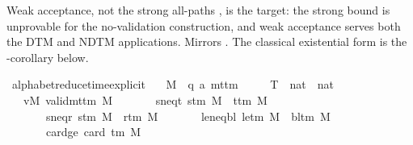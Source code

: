 \begin{isabellebody}
\begin{isamarkuptext}
  Weak acceptance, not the strong all-paths , is
  the target: the strong bound is unprovable for the no-validation
  construction, and weak acceptance serves both the DTM and NDTM
  applications.  Mirrors .  The classical
  existential form is the -corollary  below.%
\end{isamarkuptext}\isamarkuptrue%
\isamarkupfalse%
\ alphabet{\isacharunderscore}{\kern0pt}reduce{\isacharunderscore}{\kern0pt}time{\isacharunderscore}{\kern0pt}explicit{\isacharcolon}{\kern0pt}\isanewline
\ \ \ M\ {\isacharcolon}{\kern0pt}{\isacharcolon}{\kern0pt}\ {\isachardoublequoteopen}{\isacharparenleft}{\kern0pt}{\isacharprime}{\kern0pt}q{\isacharcomma}{\kern0pt}\ {\isacharprime}{\kern0pt}a{\isacharparenright}{\kern0pt}\ mttm{\isachardoublequoteclose}\isanewline
\ \ \ \ \ T\ {\isacharcolon}{\kern0pt}{\isacharcolon}{\kern0pt}\ {\isachardoublequoteopen}nat\ {\isasymRightarrow}\ nat{\isachardoublequoteclose}\isanewline
\ \ \ vM{\isacharcolon}{\kern0pt}\ {\isachardoublequoteopen}valid{\isacharunderscore}{\kern0pt}mttm\ M{\isachardoublequoteclose}\isanewline
\ \ \ \ \ \ \ s{\isacharunderscore}{\kern0pt}neq{\isacharunderscore}{\kern0pt}t{\isacharcolon}{\kern0pt}\ {\isachardoublequoteopen}s{\isacharunderscore}{\kern0pt}tm\ M\ {\isasymnoteq}\ t{\isacharunderscore}{\kern0pt}tm\ M{\isachardoublequoteclose}\isanewline
\ \ \ \ \ \ \ s{\isacharunderscore}{\kern0pt}neq{\isacharunderscore}{\kern0pt}r{\isacharcolon}{\kern0pt}\ {\isachardoublequoteopen}s{\isacharunderscore}{\kern0pt}tm\ M\ {\isasymnoteq}\ r{\isacharunderscore}{\kern0pt}tm\ M{\isachardoublequoteclose}\isanewline
\ \ \ \ \ \ \ le{\isacharunderscore}{\kern0pt}neq{\isacharunderscore}{\kern0pt}bl{\isacharcolon}{\kern0pt}\ {\isachardoublequoteopen}le{\isacharunderscore}{\kern0pt}tm\ M\ {\isasymnoteq}\ bl{\isacharunderscore}{\kern0pt}tm\ M{\isachardoublequoteclose}\isanewline
\ \ \ \ \ \ \ card{\isacharunderscore}{\kern0pt}ge{\isacharcolon}{\kern0pt}\ {\isachardoublequoteopen}card\ {\isacharparenleft}{\kern0pt}{\isasymGamma}{\isacharunderscore}{\kern0pt}tm\ M{\isacharparenright}{\kern0pt}\ {\isasymge}\ {}{\isachardoublequoteclose}\isanewline

\end{isabellebody}

